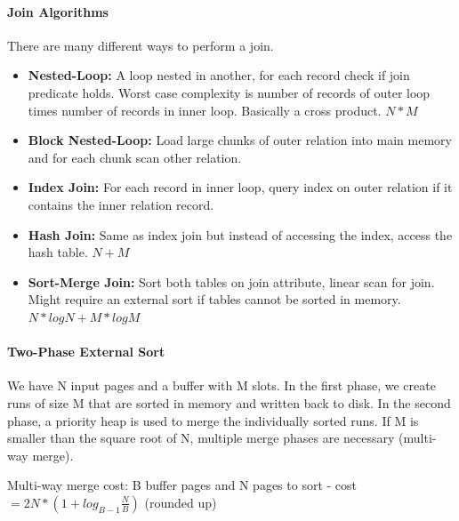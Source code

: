 \paragraph{Join Algorithms}
There are many different ways to perform a join.
\begin{itemize}
    \item \textbf{Nested-Loop:} A loop nested in another, for each record check if join predicate holds. Worst case complexity is number of records of outer loop times number of records in inner loop. Basically a cross product. $N*M$
    \item \textbf{Block Nested-Loop:} Load large chunks of outer relation into main memory and for each chunk scan other relation.
    \item \textbf{Index Join:} For each record in inner loop, query index on outer relation if it contains the inner relation record.
    \item \textbf{Hash Join:} Same as index join but instead of accessing the index, access the hash table. $N+M$
    \item \textbf{Sort-Merge Join:} Sort both tables on join attribute, linear scan for join. Might require an external sort if tables cannot be sorted in memory. $N*logN + M*logM$
\end{itemize}







\paragraph{Two-Phase External Sort}
We have N input pages and a buffer with M slots. In the first phase, we create runs of size M that are sorted in memory and written back to disk. In the second phase, a priority heap is used to merge the individually sorted runs. If M is smaller than the square root of N, multiple merge phases are necessary (multi-way merge).

Multi-way merge cost: B buffer pages and N pages to sort - cost $= 2N * (1 + log_{B-1} \frac{N}{B})$ (rounded up)











